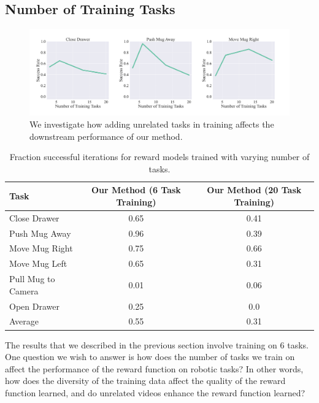 \subsection{Number of Training Tasks}

\begin{figure}[t]
\vspace{-0.2in}
\begin{center}
    \includegraphics[width=\linewidth]{figs_reward/graph_task_ablation.pdf}
\end{center}
\vspace{-0.1in}
  \caption{\small We investigate how adding unrelated tasks in training affects the downstream performance of our method.}
 \label{fig:graph_task_ablation_reward}
\end{figure}

\begin{table}[t]
    \centering
    \resizebox{\linewidth}{!}
    {%
        \begin{tabular}{lcc}
        \toprule
        Task & Our Method (6 Task Training) & Our Method (20 Task Training) \\
        \midrule
        Close Drawer & 0.65 & 0.41 \\
        Push Mug Away & 0.96 & 0.39 \\
        Move Mug Right & 0.75 & 0.66 \\
        Move Mug Left & 0.65 & 0.31 \\
        Pull Mug to Camera & 0.01 & 0.06 \\
        Open Drawer & 0.25 & 0.0 \\
        \midrule\midrule
        Average & 0.55 & 0.31 \\
        \bottomrule
        \end{tabular}
    }
    \vspace{0.05in}
    \caption{Fraction successful iterations for reward models trained with varying number of tasks.}
    \label{table:more_tasks_reward}
\end{table}


The results that we described in the previous section involve training on 6 tasks. One question we wish to answer is how does the number of tasks we train on affect the performance of the reward function on robotic tasks? In other words, how does the diversity of the training data affect the quality of the reward function learned, and do unrelated videos enhance the reward function learned?

